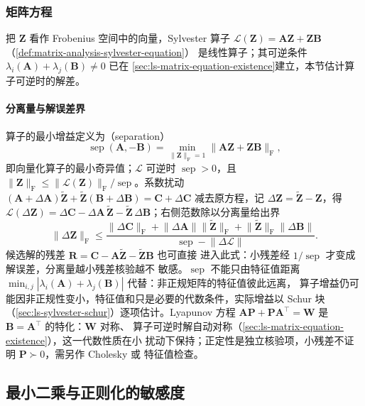 \subsubsection{矩阵方程}
\label{sec:ls-matrix-equation-sensitivity}

把 $\bm Z$ 看作 Frobenius 空间中的向量，Sylvester 算子
$\mathcal L(\bm Z)=\bm A\bm Z+\bm Z\bm B$（\ref{def:matrix-analysis-sylvester-equation}）
是线性算子；其可逆条件 $\lambda_i(\bm A)+\lambda_j(\bm B)\neq0$ 已在
\ref{sec:ls-matrix-equation-existence}建立，本节估计算子可逆时的解差。

\paragraph{分离量与解误差界}

算子的最小增益定义为（separation）
\[
 \operatorname{sep}(\bm A,-\bm B)
 =\min_{\lVert\bm Z\rVert_{\mathrm F}=1}
 \lVert\bm A\bm Z+\bm Z\bm B\rVert_{\mathrm F},
\]
即向量化算子的最小奇异值；$\mathcal L$ 可逆时 $\operatorname{sep}>0$，且
$\lVert\bm Z\rVert_{\mathrm F}\leq\lVert\mathcal L(\bm Z)\rVert_{\mathrm F}/
\operatorname{sep}$。系数扰动 $(\bm A+\Delta\bm A)\widetilde{\bm Z}
+\widetilde{\bm Z}(\bm B+\Delta\bm B)=\bm C+\Delta\bm C$ 减去原方程，记
$\Delta\bm Z=\widetilde{\bm Z}-\bm Z$，得
$\mathcal L(\Delta\bm Z)=\Delta\bm C-\Delta\bm A\,\widetilde{\bm Z}
-\widetilde{\bm Z}\,\Delta\bm B$；右侧范数除以分离量给出界
\[
 \lVert\Delta\bm Z\rVert_{\mathrm F}
 \leq
 \frac{\lVert\Delta\bm C\rVert_{\mathrm F}
 +\lVert\Delta\bm A\rVert\lVert\widetilde{\bm Z}\rVert_{\mathrm F}
 +\lVert\widetilde{\bm Z}\rVert_{\mathrm F}\lVert\Delta\bm B\rVert}
 {\operatorname{sep}-\lVert\Delta\mathcal L\rVert}.
\]
候选解的残差 $\bm R=\bm C-\bm A\widetilde{\bm Z}-\widetilde{\bm Z}\bm B$ 也可直接
进入此式：小残差经 $1/\operatorname{sep}$ 才变成解误差，分离量越小残差核验越不
敏感。$\operatorname{sep}$ 不能只由特征值距离
$\min_{i,j}|\lambda_i(\bm A)+\lambda_j(\bm B)|$ 代替：非正规矩阵的特征值彼此远离，
算子增益仍可能因非正规性变小，特征值和只是必要的代数条件，实际增益以 Schur 块
（\ref{sec:ls-sylvester-schur}）逐项估计。Lyapunov 方程
$\bm A\bm P+\bm P\bm A^\top=\bm W$ 是 $\bm B=\bm A^\top$ 的特化：$\bm W$ 对称、
算子可逆时解自动对称（\ref{sec:ls-matrix-equation-existence}），这一代数性质在小
扰动下保持；正定性是独立核验项，小残差不证明 $\bm P\succ0$，需另作 Cholesky 或
特征值检查。

\subsection{最小二乘与正则化的敏感度}
\label{sec:ls-ls-regularization-sensitivity}

